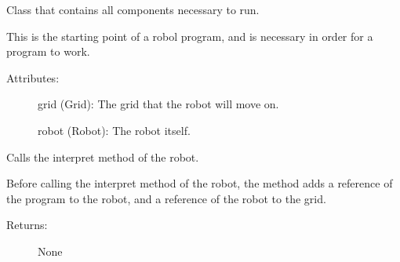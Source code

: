 \documentclass[letterpaper,10pt,english]{sphinxmanual}
\begin{document}
\begin{fulllineitems}
\label{\detokenize{robol:robol_lang.robol.Program}}
\sphinxAtStartPar
Class that contains all components necessary to run.

\sphinxAtStartPar
This is the starting point of a robol program, and is necessary in order
for a program to work.
\begin{description}
\item[{Attributes:}] \leavevmode
\sphinxAtStartPar
grid (Grid): The grid that the robot will move on.

\sphinxAtStartPar
robot (Robot): The robot itself.

\end{description}

\begin{fulllineitems}
\label{\detokenize{robol:robol_lang.robol.Program.interpret}}
\sphinxAtStartPar
Calls the interpret method of the robot.

\sphinxAtStartPar
Before calling the interpret method of the robot, the method adds a
reference of the program to the robot, and a reference of the robot
to the grid.
\begin{description}
\item[{Returns:}] \leavevmode
\sphinxAtStartPar
None

\end{description}

\end{fulllineitems}


\end{fulllineitems}

\end{document}
